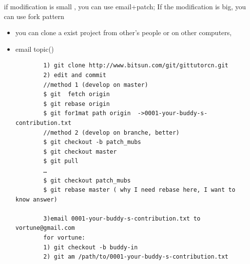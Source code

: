 \documentclass[a4paper,12pt,twoside]{book}
\begin{document}
%
%
%
%

	if modification is small , you can use email+patch; If the modification is big, you can use fork pattern
	\begin{itemize}
    \item you can clone a exist project from other's people or on other computers,
	\item email topic()
		\begin{verbatim}
		1) git clone http://www.bitsun.com/git/gittutorcn.git
		2) edit and commit
		//method 1 (develop on master)
		$ git  fetch origin
		$ git rebase origin
		$ git for1mat path origin  ->0001-your-buddy-s-contribution.txt
		//method 2 (develop on branche, better)
		$ git checkout -b patch_mubs
		$ git checkout master
		$ git pull
		…
		$ git checkout patch_mubs
		$ git rebase master ( why I need rebase here, I want to know answer)
		
		3)email 0001-your-buddy-s-contribution.txt to vortune@gmail.com
		for vortune:
		1) git checkout -b buddy-in
		2) git am /path/to/0001-your-buddy-s-contribution.txt
		\end{verbatim}
	\end{itemize}
\end{document}

